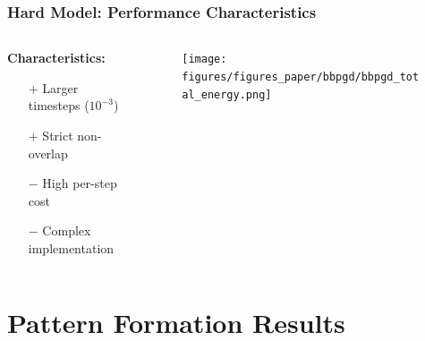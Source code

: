 \documentclass[10pt,t]{beamer}
\begin{document}
\begin{frame}
    \frametitle{Hard Model: Performance Characteristics}

    \vspace{0.5cm
    }
    \begin{columns}[c] %
        \begin{column}{0.45\textwidth}
            \textbf{Characteristics:}
            \begin{itemize}
                \item[$+$] Larger timesteps ($10^{-3}$)
                \item[$+$] Strict non-overlap
                \item[$-$] High per-step cost
                \item[$-$] Complex implementation
            \end{itemize}
        \end{column}

        \begin{column}{0.65\textwidth}

            \begin{figure}
                \centering
                \texttt{[image: figures/figures\_paper/bbpgd/bbpgd\_total\_energy.png]}
            \end{figure}
        \end{column}
    \end{columns}

\end{frame}




\section{Pattern Formation Results}
\end{document}

